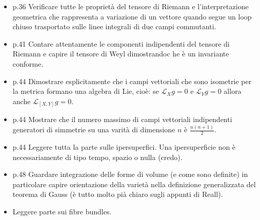 \documentclass[10pt,a4paper]{article}
\begin{document}
\begin{itemize}
\item p.36 Verificare tutte le proprietà del tensore di Riemann  e l'interpretazione geometrica che rappresenta a variazione di un vettore quando segue un loop chiuso trasportato sulle linee integrali di due campi commutanti.

\item p.41 Contare attentamente le componenti indipendenti del tensore di Riemann e capire il tensore di Weyl dimostrandoc he è un invariante conforme.

\item p.44 Dimostrare esplicitamente che i campi vettoriali che sono isometrie per la metrica formano una algebra di Lie, cioè: se $\mathcal{L}_{X} g = 0$ e $\mathcal{L}_{Y} g = 0$ allora anche $\mathcal{L}_{[X, Y]} g = 0$.

\item p.44 Mostrare che il numero massimo di campi vettoriali indipendenti generatori di simmetrie su una varità di dimensione $n$ è $\frac{n(n+1)}{2}$.

\item p.44 Leggere tutta la parte sulle ipersuperfici. Una ipersuperficie non è necessariamente di tipo tempo, spazio o nulla (credo).

\item p.48 Guardare integrazione delle forme di volume (e come sono definite) in particolare capire orientazione della varietà nella definizione generalizzata del teorema di Gauss (è tutto molto pià chiaro sugli appunti di Reall).

\item Leggere parte sui fibre bundles.

\end{itemize}
\end{document}
